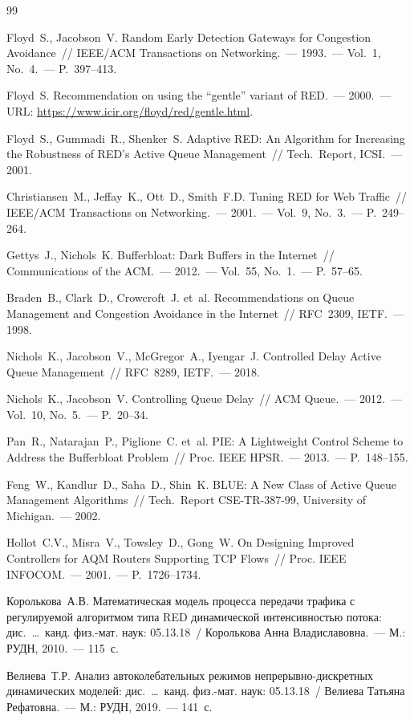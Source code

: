 \documentclass[12pt,a4paper]{article}
\begin{document}
\begin{thebibliography}{99}

Floyd~S., Jacobson~V. Random Early Detection Gateways for Congestion Avoidance~// IEEE/ACM Transactions on Networking.~--- 1993.~--- Vol.~1, No.~4.~--- P.~397--413.

Floyd~S. Recommendation on using the ``gentle'' variant of RED.~--- 2000.~--- URL: \url{https://www.icir.org/floyd/red/gentle.html}.

Floyd~S., Gummadi~R., Shenker~S. Adaptive RED: An Algorithm for Increasing the Robustness of RED's Active Queue Management~// Tech.~Report, ICSI.~--- 2001.

Christiansen~M., Jeffay~K., Ott~D., Smith~F.D. Tuning RED for Web Traffic~// IEEE/ACM Transactions on Networking.~--- 2001.~--- Vol.~9, No.~3.~--- P.~249--264.

Gettys~J., Nichols~K. Bufferbloat: Dark Buffers in the Internet~// Communications of the ACM.~--- 2012.~--- Vol.~55, No.~1.~--- P.~57--65.

Braden~B., Clark~D., Crowcroft~J. et~al. Recommendations on Queue Management and Congestion Avoidance in the Internet~// RFC~2309, IETF.~--- 1998.

Nichols~K., Jacobson~V., McGregor~A., Iyengar~J. Controlled Delay Active Queue Management~// RFC~8289, IETF.~--- 2018.

Nichols~K., Jacobson~V. Controlling Queue Delay~// ACM Queue.~--- 2012.~--- Vol.~10, No.~5.~--- P.~20--34.

Pan~R., Natarajan~P., Piglione~C. et~al. PIE: A Lightweight Control Scheme to Address the Bufferbloat Problem~// Proc. IEEE HPSR.~--- 2013.~--- P.~148--155.

Feng~W., Kandlur~D., Saha~D., Shin~K. BLUE: A New Class of Active Queue Management Algorithms~// Tech.~Report CSE-TR-387-99, University of Michigan.~--- 2002.

Hollot~C.V., Misra~V., Towsley~D., Gong~W. On Designing Improved Controllers for AQM Routers Supporting TCP Flows~// Proc. IEEE INFOCOM.~--- 2001.~--- P.~1726--1734.

Королькова~А.В. Математическая модель процесса передачи трафика с регулируемой алгоритмом типа RED динамической интенсивностью потока: дис.~\ldots~канд. физ.-мат. наук: 05.13.18~/ Королькова Анна Владиславовна.~--- М.: РУДН, 2010.~--- 115~с.

Велиева~Т.Р. Анализ автоколебательных режимов непрерывно-дискретных динамических моделей: дис.~\ldots~канд. физ.-мат. наук: 05.13.18~/ Велиева Татьяна Рефатовна.~--- М.: РУДН, 2019.~--- 141~с.

\end{thebibliography}
\end{document}

